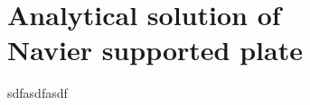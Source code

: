 \chapter[Analytical solution of Navier supported plate]{Analytical solution of\\ Navier supported plate}
\label{app:Analytical solution of Navier supported plate}

sdfasdfasdf